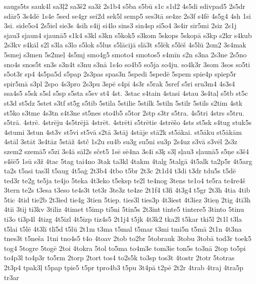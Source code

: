 {{saugs5ts sauk4l sa3\c{l}2 sa3\v{s}2 sa3\v{z} 2s1b4 s5ba s5b\={u}
s1c s1d2 4s5di sdivpad5 2s5dr sd\={a}r5 3s4d\={e} 1s4e 5sed se4gr
sei2d sek5l semp5 ses3t\={a} se4ze 2s3f s4f\={e} 4s5g4 4sh 1si 3si.
side5o4 2s5iel sie3s 4sih s4ij si4lo sins3 sin4sp si5o4 3s4ir sir5mi
2siz 2s1j sjau3 sjaun4 sjaun\={a}5 s1k4 s3kl s3kn s5kok5 s3kom 5skops
5skop\={a} s3kp s2kr s4kub 2s3kv s4k\={a}l s2l s3la s3lo s5lok s5lus
s5l\={a}cij\={a} sl\={a}3t s5l\={e}k s5l\={e}\v{s} 4s5l\={u}
2sm2 3s4mak 5smej s3men 5s2me\c{l} 4s5mj smo4g5 smoto4 smotos5
s4m\={i}n s2n s3na 2s3ne 2s5no sno4s snos5t sn3s s3n4t s3nu s3n\={a}
1s4o so4b5 so5ja so4ju. so4k3r 3som 3sos so5ti s5ot3r sp4 4s5pa5d
s5pap 2s3pas spas3n 5spedi 5sped\={e} 5spem spie4p spiep5r spir5m\={a}
s3pl 2spo 4s3pro 2s3pu 3sp\={e} s4p\={i} 4s3r s5rak 5sref
s5ri sru3m4 4s3s4 ssa4s5 s5sk s5sl s5sp s5sta s5sv st4 4st. 3stac s4tain
4stasi 4stau 3s4ta\c{l} s5tb st5c st3d st5dz 5stet s3tf st5g s5tib
5stila 5stilie 5stilk 5stiln 5stilr 5stils s2tim 4stk st5ko s3tme
4s3tn s4t3ne st5nes sto4b5 s5tor 2stp s3tr s5tra. 4s5tri 4strs s5tru.
s5tr\={a}. 4str\={e}. 4str\={e}ju 4s5tr\={e}j\={a} 4str\={e}t.
4str\={e}ti s5tr\={e}tie 4str\={e}\v{s}o 4sts st5sk s4tug
stuk5s 4stumi 3stun 4st3v st5vi st5v\={a} s2t\={a} 3st\={a}j 4st\={a}je
st\={a}2k st5\={a}kai. st5\={a}ku st5\={a}k\={a}m 4st\={a}l
3st\={a}t 3s4t\={a}z 5st\={a}\v{z} 4st\v{c} 1s2u su4b su3g
su5ni su3p 2s4uz s3v\={a} s3v\={e}l 2s3z szem2 szem\={a}5 s5z\={i}
3s4\={a} s\={a}l2s s\v{c}et5 1s\={e} s\={e}4na 3s4\={i} s3\c{k}
s3\c{l} s\c{l}au3 s\c{l}aun\={a}5 s5\c{n}e s3\v{s}4 s4\v{s}\={e}5
1s\={u} s3\v{z} 4tac 5tag tai4no 3tak ta3kl 4takm 4talg
5talg\={a} 4t5alk ta2p5r 4t5arg ta2s t5asi tas3l t5aug 4t5a\c{g}
2t3b4 4tbo t5br 2t3c 2t1d4 t3di t3dr tdu5s t5d\={e} ted3r te2g
te5ja te4jo 5teka 4t3eko t5eksp te2l te4nog 3tens te1o4 te5ra te4re4\v{s}
3tern te2s t3esa t3eso te4s3t tet3r 3te3z te4ze 2t1f4 t3fi
4t3g4 t5gr 2t3h 4tia 4tib 5tic 4tid tie2b 2t3ied tie4g 3tien 5tiep.
ties3l ties3p 4t3iest 4t3iez 3tie\c{n} 2tig 4ti3h 4tii 3tij ti3kv
3tiliz 4timet t5imp ti5ni 5tin5s 2t3int tinte5 tintere5 3tinto 5tinu
ti3o ti3p4l 4tizg 4t5izl 4t5izp tiz4s5 2t1j4 t5jk 4t3k2 tka2l t5kar
tki5l 2t1l t3la t5lai t5l\={e} 4t3l\={i} tl\={i}5d t5l\={u} 2t1m
t3ma t5mal t5mar t3mi tmi5n t5m\={a} 2t1n 4t3na tnes3t t5ne\v{s}a
1tni tno4s5 t4o 4toav 2tob to2br 5tobrauk 3tobu 3tob\={a} tod3r
toek5 tog4 5togre 5tog\={e} 2toi 4tokra 5tol to5ma to4m3e tom3ie
ton5s to3n\={a} 2top to5pi to4p3l to4p3r to5rm 2torp 2tort tos4
to2s5k to3sp tos3t 4tostr 2totr 5totras 2t3p4 tpak3\c{l} t5pap tpie5
t5pr tpro4b3 t5pu 3t4p\={a} t2p\={e} 2t2r 4trab 4traj 4tra5p tr3ar
}}
